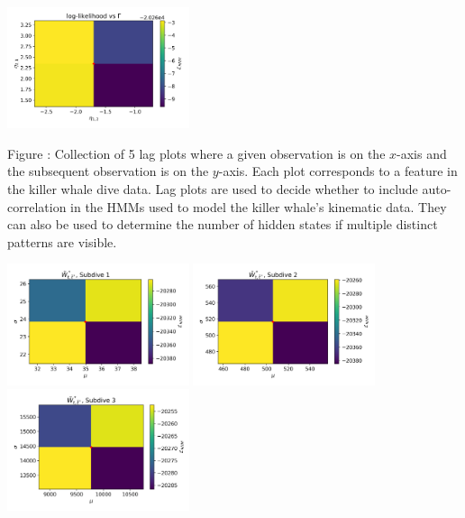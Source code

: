 \documentclass{article}
\begin{document}
        
        \begin{center}
        \includegraphics[width=2.1in]{../Plots/2019/20190902-182840-CATs_OB_1_0_267_CarHHMM2_coarse-eta-likelihood.png}
        \end{center}
        
        \noindent Figure : Collection of 5 lag plots where a given observation is on the $x$-axis and the subsequent observation is on the $y$-axis. Each plot corresponds to a feature in the killer whale dive data. Lag plots are used to decide whether to include auto-correlation in the HMMs used to model the killer whale's kinematic data. They can also be used to determine the number of hidden states if multiple distinct patterns are visible. 
        \addtocounter{fignum}{1}
        
        \begin{center}
        \includegraphics[width=2.1in]{../Plots/2019/20190902-182840-CATs_OB_1_0_267_CarHHMM2_fine-theta-likelihood-Ahat_low-0.png}
        \includegraphics[width=2.1in]{../Plots/2019/20190902-182840-CATs_OB_1_0_267_CarHHMM2_fine-theta-likelihood-Ahat_low-1.png}
        \includegraphics[width=2.1in]{../Plots/2019/20190902-182840-CATs_OB_1_0_267_CarHHMM2_fine-theta-likelihood-Ahat_low-2.png}
        \end{center}
        
\end{document}
